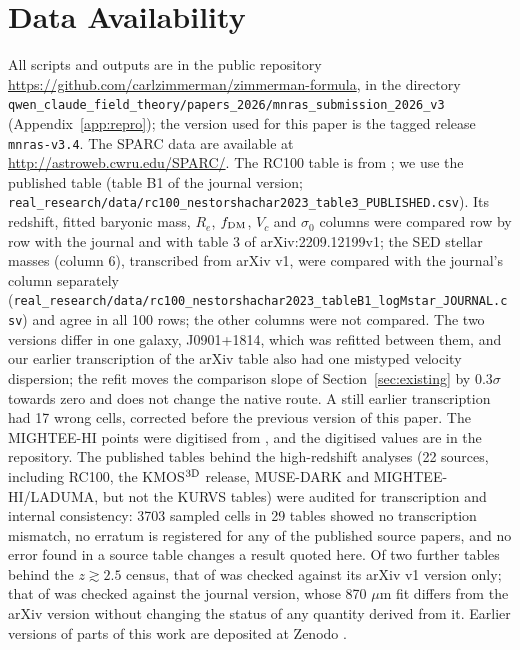 \documentclass[fleqn,usenatbib]{mnras}
\newif\ifpapersix
\begin{document}
\section*{Data Availability}
All scripts and outputs are in the public repository \url{https://github.com/carlzimmerman/zimmerman-formula}, in the directory \nolinkurl{qwen_claude_field_theory/papers_2026/mnras_submission_2026_v3} (Appendix~\ref{app:repro}); the version used for this paper is the tagged release \texttt{mnras-v3.4}. The SPARC data are available at \url{http://astroweb.cwru.edu/SPARC/}. The RC100 table is from \citet{NestorShachar2023}; we use the published table (table B1 of the journal version; \nolinkurl{real_research/data/rc100_nestorshachar2023_table3_PUBLISHED.csv}). Its redshift, fitted baryonic mass, $R_e$, $f_{\rm DM}$, $V_c$ and $\sigma_0$ columns were compared row by row with the journal and with table 3 of arXiv:2209.12199v1; the SED stellar masses (column 6), transcribed from arXiv v1, were compared with the journal's column separately (\nolinkurl{real_research/data/rc100_nestorshachar2023_tableB1_logMstar_JOURNAL.csv}) and agree in all 100 rows; the other columns were not compared. The two versions differ in one galaxy, J0901+1814, which was refitted between them, and our earlier transcription of the arXiv table also had one mistyped velocity dispersion; the refit moves the comparison slope of Section~\ref{sec:existing} by $0.3\sigma$ towards zero and does not change the native route. A still earlier transcription had 17 wrong cells, corrected before the previous version of this paper. The MIGHTEE-HI points were digitised from \citet{Varasteanu2025}, and the digitised values are in the repository. The published tables behind the high-redshift analyses (22 sources, including RC100, the KMOS$^{\rm 3D}$ release, MUSE-DARK and MIGHTEE-HI/LADUMA, but not the KURVS tables) were audited for transcription and internal consistency: 3703 sampled cells in 29 tables showed no transcription mismatch, no erratum is registered for any of the published source papers, and no error found in a source table changes a result quoted here. Of two further tables behind the $z\gtrsim2.5$ census, that of \citet{ForsterSchreiber2018} was checked against its arXiv v1 version only; that of \citet{Umehata2026} was checked against the journal version, whose 870 $\mu$m fit differs from the arXiv version without changing the status of any quantity derived from it. Earlier versions of parts of this work are deposited at Zenodo \ifpapersix\citep{Zimmerman2026kappa,Zimmerman2026a0z,Zimmerman2026wall}\else\citep{Zimmerman2026a0z,Zimmerman2026wall}\fi.
\end{document}
